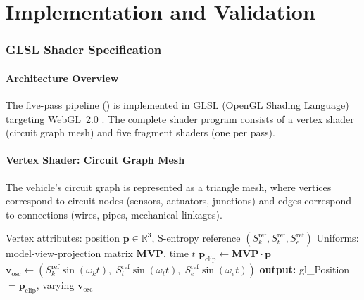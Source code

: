 \documentclass[11pt,twocolumn,a4paper]{article}
\theoremstyle{definition}
\theoremstyle{remark}
\newcommand{\Sk}{S_{k}}
\newcommand{\St}{S_{t}}
\newcommand{\Se}{S_{e}}
\newcommand{\R}{\mathbb{R}}
\begin{document}
\begin{figure}[!htbp]
    \label{fig:collapse_stability}
\end{figure}




\part{Implementation and Validation}

\section{GLSL Shader Specification}\label{sec:glsl-shader}

\subsection{Architecture Overview}

The five-pass pipeline () is implemented in GLSL (OpenGL Shading Language) targeting WebGL~2.0 \citep{marrin2011webgl}.  The complete shader program consists of a vertex shader (circuit graph mesh) and five fragment shaders (one per pass).

\subsection{Vertex Shader: Circuit Graph Mesh}

The vehicle's circuit graph is represented as a triangle mesh, where vertices correspond to circuit nodes (sensors, actuators, junctions) and edges correspond to connections (wires, pipes, mechanical linkages).

\begin{algorithm}[H]
\caption{Vertex Shader: Circuit Graph}\label{alg:vertex-shader}
\begin{algorithmic}[1]
\Require Vertex attributes: position $\mathbf{p} \in \R^3$, S-entropy reference $(\Sk^{\mathrm{ref}}, \St^{\mathrm{ref}}, \Se^{\mathrm{ref}})$
\Require Uniforms: model-view-projection matrix $\mathbf{MVP}$, time $t$
\State $\mathbf{p}_{\mathrm{clip}} \gets \mathbf{MVP} \cdot \mathbf{p}$
\State $\mathbf{v}_{\mathrm{osc}} \gets (\Sk^{\mathrm{ref}} \sin(\omega_k t),\; \St^{\mathrm{ref}} \sin(\omega_t t),\; \Se^{\mathrm{ref}} \sin(\omega_e t))$
\State \textbf{output:} gl\_Position $= \mathbf{p}_{\mathrm{clip}}$, varying $\mathbf{v}_{\mathrm{osc}}$
\end{algorithmic}
\end{algorithm}
\end{document}

